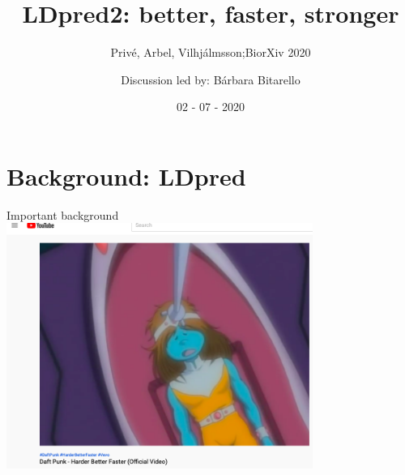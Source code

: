 \documentclass{beamer}
\title{LDpred2: better, faster, stronger }
\subtitle{Privé, Arbel, Vilhjálmsson;BiorXiv 2020}
\author{Discussion led by: Bárbara Bitarello}
\date{02 - 07 - 2020}
\begin{document}
    \begin{frame}
        \maketitle
    \end{frame}
    
   \section{Background: LDpred}
   
   \begin{frame}
   \large Important background 
   \includegraphics[width=100mm,scale=1]{daft_punk.png}
       
   \end{frame}
\end{document}
